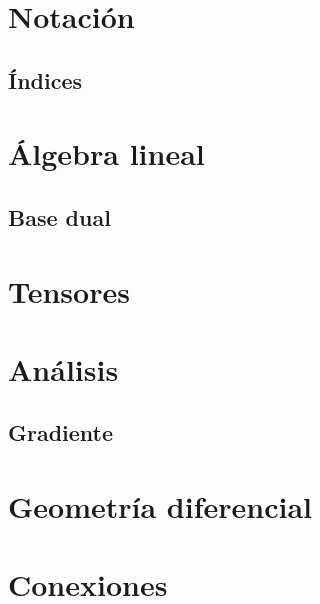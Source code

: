 \documentclass[11pt,fleqn]{book}
\begin{document}
\chapter{Notaci\'on}\label{ch:notacion}

\section{\'Indices}\label{sec:indices}

\chapter{Álgebra lineal}\label{ch:algebra-lineal}
\section{Base dual}\label{sec:base-dual}

\chapter{Tensores}\label{ch:tensores}

\chapter{An\'alisis}\label{ch:analisis}
\section{Gradiente}\label{sec:gradiente}

\chapter{Geometría diferencial}\label{ch:geometria-diferencial}

\chapter{Conexiones}\label{ch:conexiones}

\end{document}
